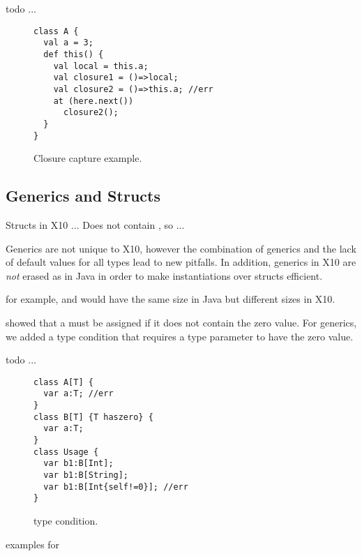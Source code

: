  todo ...

\begin{figure}
\begin{lstlisting}
class A {
  val a = 3;
  def this() {
    val local = this.a;
    val closure1 = ()=>local;
    val closure2 = ()=>this.a; //err
    at (here.next())
      closure2();
  }
}
\end{lstlisting}
\caption{Closure capture \this example.
    }
\label{Figure:Closures}
\end{figure}



\subsection{Generics and Structs}
\label{Section:Generics-and-Structs}
Structs in X10 ...
Does not contain , so  ...

Generics are not unique to X10,
    however the combination of generics and the lack of default values for all types
    lead to new pitfalls.
In addition, generics in X10 are \emph{not} erased as in Java
    in order to make instantiations over structs efficient.

for example,  and 
    would have the same size in Java but different sizes in X10.

 showed that a  must be assigned if
    it does not contain the zero value.
For generics, we added a  type condition that requires a type parameter to have the zero value.


 todo ...

\begin{figure}
\begin{lstlisting}
class A[T] {
  var a:T; //err
}
class B[T] {T haszero} {
  var a:T;
}
class Usage {
  var b1:B[Int];
  var b1:B[String];
  var b1:B[Int{self!=0}]; //err
}
\end{lstlisting}
\caption{ type condition.
    }
\label{Figure:Generics}
\end{figure}


examples for 








